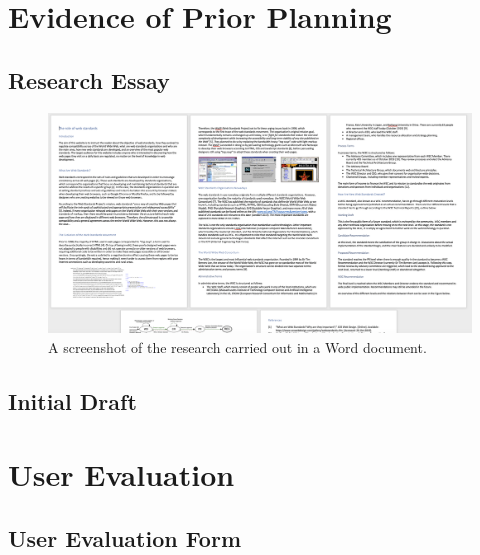 \documentclass[letterpaper,12pt]{article}
\begin{document}
\begin{appendices}

\newpage



\clearpage
\section{Evidence of Prior Planning}

\subsection{Research Essay}
\label{sec:appendix-prior-planning-research-essay}

\begin{figure}[h] 
\centerline{\includegraphics[width=1.1\textwidth]{report/images/prior-planning-research.png}}
\caption{\label{fig:prior-planning-research}A screenshot of the research carried out in a Word document.}
\end{figure}

\subsection{Initial Draft}
\label{sec:appendix-prior-initial-draft}



\clearpage
\section{User Evaluation}

\subsection{User Evaluation Form}


\end{appendices}
\end{document}
